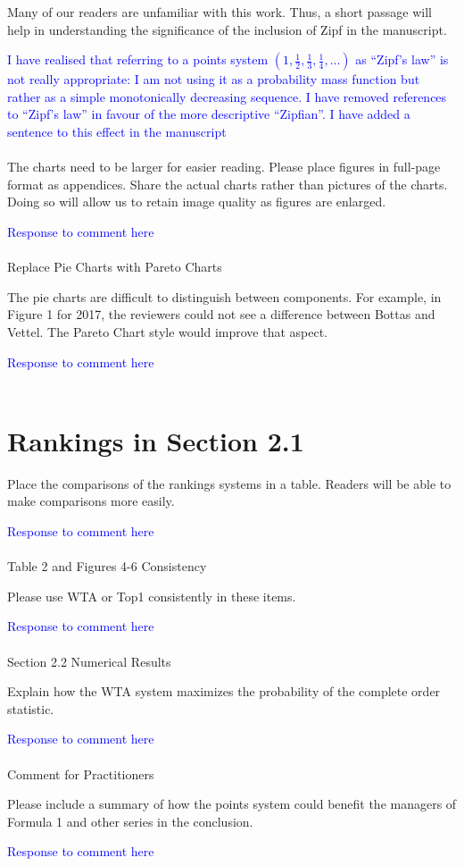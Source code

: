 \documentclass[12pt]{article}
\begin{document}
Many of our readers are unfamiliar with this work.  Thus, a short
passage will help in understanding the significance of the inclusion
of Zipf in the manuscript.

\textcolor{blue}{I have realised that referring to a points system
  $\left(1,\frac{1}{2},\frac{1}{3},\frac{1}{4},\ldots\right)$ as
  ``Zipf's law'' is not really appropriate: I am not using it as a
  probability mass function but rather as a simple monotonically
  decreasing sequence.  I have removed references to ``Zipf's law'' in
  favour of the more descriptive ``Zipfian''.  I have added a sentence
  to this effect in the manuscript}\\ \\

The charts need to be larger for easier reading.  Please place figures
in full-page format as appendices.  Share the actual charts rather
than pictures of the charts.  Doing so will allow us to retain image
quality as figures are enlarged.

\textcolor{blue}{Response to comment here}\\ \\

Replace Pie Charts with Pareto Charts

The pie charts are difficult to distinguish between components. For
example, in Figure 1 for 2017, the reviewers could not see a
difference between Bottas and Vettel.  The Pareto Chart style would
improve that aspect.

\textcolor{blue}{Response to comment here}\\ \\


\section*{Rankings in Section 2.1}

Place the comparisons of the rankings systems in a table.  Readers will
be able to make comparisons more easily.

\textcolor{blue}{Response to comment here}\\ \\


Table 2 and Figures 4-6 Consistency

Please use WTA or Top1 consistently in these items.

\textcolor{blue}{Response to comment here}\\ \\

Section 2.2 Numerical Results

Explain how the WTA system maximizes the probability of the complete
order statistic.

\textcolor{blue}{Response to comment here}\\ \\


Comment for Practitioners

Please include a summary of how the points system could benefit the
managers of Formula 1 and other series in the conclusion.

\textcolor{blue}{Response to comment here}\\ \\
\end{document}
